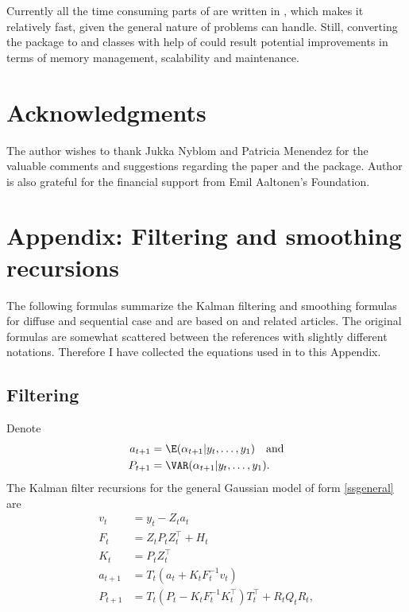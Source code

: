 \documentclass[nojss,article]{jss}\usepackage[]{graphicx}\usepackage[]{color}
\begin{document}
Currently all the time consuming parts of  are written in , which makes it relatively fast, given the general nature of problems  can handle. Still, converting the package to  and  classes with help of  \citep{RcppA,RcppB} could result potential improvements in terms of memory management, scalability and maintenance.

\section*{Acknowledgments}

The author wishes to thank Jukka Nyblom and Patricia Menendez for the valuable comments and suggestions regarding the paper and the package. Author is also grateful for the financial support from Emil Aaltonen's Foundation.

\clearpage
\newpage
\appendix
\section{Appendix: Filtering and smoothing recursions}\label{appendix}

The following formulas summarize the Kalman filtering and smoothing formulas for diffuse and sequential case and  are based on \citet{DK2001} and related articles. The original formulas are somewhat scattered between the references with slightly different notations. Therefore I have collected the equations used in  to this Appendix.
\subsection{Filtering}
Denote
\begin{equation*}
\begin{aligned}
a_{t+1} &= \E(\alpha_{t+1}|y_t,\ldots,y_1) \quad \textrm{and}  \\
P_{t+1} &= \VAR(\alpha_{t+1}|y_t,\ldots,y_1).
\end{aligned}
\end{equation*}
The Kalman filter recursions for the general Gaussian model of form \eqref{ssgeneral} are
\begin{equation*}
\begin{aligned}
v_t &= y_t - Z_t a_t \\
F_t &= Z_t P_t Z_t^\top + H_t \\
K_t &= P_t Z_t^\top \\
a_{t+1} &= T_t (a_t + K_t F^{-1}_t v_t) \\
P_{t+1} &= T_t (P_t -K_tF^{-1}_tK_t^\top)T_t^\top + R_t Q_t R_t,
\end{aligned}
\end{equation*}
\end{document}
